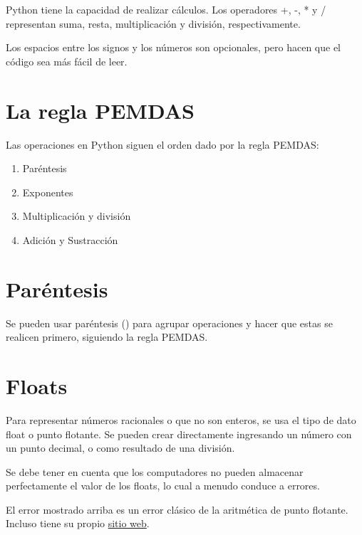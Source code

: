 \documentclass{report}
\begin{document}
Python tiene la capacidad de realizar cálculos. Los operadores +, -, * y / representan suma, resta, multiplicación y división, respectivamente.


Los espacios entre los signos y los números son opcionales, pero hacen que el código sea más fácil de leer.

\section{La regla PEMDAS}

Las operaciones en Python siguen el orden dado por la regla PEMDAS:

\begin{enumerate}
  \item Paréntesis
  \item Exponentes
  \item Multiplicación y división
  \item Adición y Sustracción
\end{enumerate}


\section{Paréntesis}

Se pueden usar paréntesis () para agrupar operaciones y hacer que estas se realicen primero, siguiendo la regla PEMDAS.


\section{Floats}
    
Para representar números racionales o que no son enteros, se usa el tipo de dato float o punto flotante. Se pueden crear directamente ingresando un número con un punto decimal, o como resultado de una división.


Se debe tener en cuenta que los computadores no pueden almacenar perfectamente el valor de los floats, lo cual a menudo conduce a errores.


El error mostrado arriba es un error clásico de la aritmética de punto flotante. Incluso tiene su propio \href{\underline{https://0.30000000000000004.com}}{sitio web}.
\end{document}
